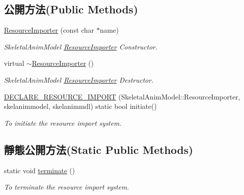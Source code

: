 \subsection*{公開方法(Public Methods)}
\begin{DoxyCompactItemize}
\item 
\hyperlink{class_magnum_1_1endif_1_1_resource_importer_acd06aaf075bf465ba03cc860315136c8}{Resource\+Importer} (const char $\ast$name)
\begin{DoxyCompactList}\small\item\em Skeletal\+Anim\+Model \hyperlink{class_magnum_1_1endif_1_1_resource_importer}{Resource\+Importer} Constructor. \end{DoxyCompactList}\item 
virtual \hyperlink{class_magnum_1_1endif_1_1_resource_importer_a8821b752797e20bb26f50a4fddfbd935}{$\sim$\+Resource\+Importer} ()
\begin{DoxyCompactList}\small\item\em Skeletal\+Anim\+Model \hyperlink{class_magnum_1_1endif_1_1_resource_importer}{Resource\+Importer} Destructor. \end{DoxyCompactList}\item 
\hyperlink{class_magnum_1_1endif_1_1_resource_importer_a7961ea6d7b1e4ad03e40f322ac0e70a6}{D\+E\+C\+L\+A\+R\+E\+\_\+\+R\+E\+S\+O\+U\+R\+C\+E\+\_\+\+I\+M\+P\+O\+RT} (Skeletal\+Anim\+Model\+::\+Resource\+Importer, skelanimmodel, skelanimmdl) static bool initiate()\hypertarget{class_magnum_1_1endif_1_1_resource_importer_a7961ea6d7b1e4ad03e40f322ac0e70a6}{}\label{class_magnum_1_1endif_1_1_resource_importer_a7961ea6d7b1e4ad03e40f322ac0e70a6}

\begin{DoxyCompactList}\small\item\em To initiate the resource import system. \end{DoxyCompactList}\end{DoxyCompactItemize}
\subsection*{靜態公開方法(Static Public Methods)}
\begin{DoxyCompactItemize}
\item 
static void \hyperlink{class_magnum_1_1endif_1_1_resource_importer_a036d4a05a3fd7588dec1177f483dfcda}{terminate} ()\hypertarget{class_magnum_1_1endif_1_1_resource_importer_a036d4a05a3fd7588dec1177f483dfcda}{}\label{class_magnum_1_1endif_1_1_resource_importer_a036d4a05a3fd7588dec1177f483dfcda}

\begin{DoxyCompactList}\small\item\em To terminate the resource import system. \end{DoxyCompactList}\end{DoxyCompactItemize}
